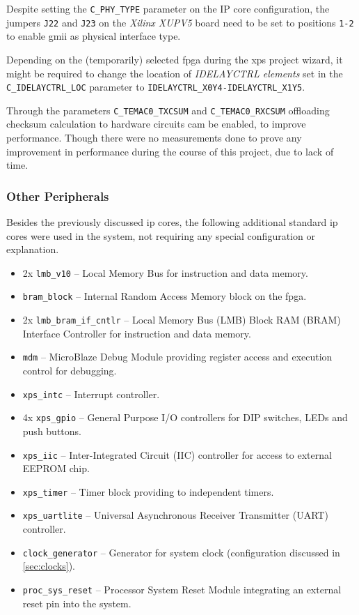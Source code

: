 Despite setting the \texttt{C\_PHY\_TYPE} parameter on the IP core configuration, the jumpers \texttt{J22} and \texttt{J23} on the \textit{Xilinx XUPV5} board need to be set to positions \texttt{1-2} to enable \gls{gmii} as physical interface type.

Depending on the (temporarily) selected \gls{fpga} during the \gls{xps} project wizard, it might be required to change the location of \textit{IDELAYCTRL elements} set in the \texttt{C\_IDELAYCTRL\_LOC} parameter to \texttt{IDELAYCTRL\_X0Y4-IDELAYCTRL\_X1Y5}.

Through the parameters \texttt{C\_TEMAC0\_TXCSUM} and \texttt{C\_TEMAC0\_RXCSUM} offloading checksum calculation to hardware circuits cam be enabled, to improve performance. Though there were no measurements done to prove any improvement in performance during the course of this project, due to lack of time.

\subsubsection{Other Peripherals}

Besides the previously discussed \gls{ip} cores, the following additional standard \gls{ip} cores were used in the system, not requiring any special configuration or explanation.

\begin{itemize}
  \setlength{\itemsep}{1pt}
  \setlength{\parskip}{2pt}
  \setlength{\parsep}{0pt}
\item 2x \texttt{lmb\_v10} -- Local Memory Bus for instruction and data memory.
\item \texttt{bram\_block} -- Internal Random Access Memory block on the \gls{fpga}.
\item 2x \texttt{lmb\_bram\_if\_cntlr} -- Local Memory Bus (LMB) Block RAM (BRAM) Interface Controller for instruction and data memory.
\item \texttt{mdm} -- MicroBlaze Debug Module providing register access and execution control for debugging.
\item \texttt{xps\_intc} -- Interrupt controller.
\item 4x \texttt{xps\_gpio} -- General Purpose I/O controllers for DIP switches, LEDs and push buttons.
\item \texttt{xps\_iic} -- Inter-Integrated Circuit (IIC) controller for access to external EEPROM chip.
\item \texttt{xps\_timer} -- Timer block providing to independent timers.
\item \texttt{xps\_uartlite} -- Universal Asynchronous Receiver Transmitter (UART) controller.
\item \texttt{clock\_generator} -- Generator for system clock (configuration discussed in \ref{sec:clocks}).
\item \texttt{proc\_sys\_reset} -- Processor System Reset Module integrating an external reset pin into the system.
\end{itemize}

